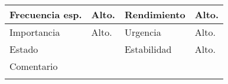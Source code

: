 \documentclass{article}
\begin{document}
\begin{table}[h]
\begin{tabular}{|l|l|l|l|l|l|}
\hline
\multicolumn{1}{|p{2cm}|}{Frecuencia esp.} & \multicolumn{2}{p{3cm}}{Alto.} & \multicolumn{1}{|p{2cm}|}{Rendimiento} & \multicolumn{2}{p{3cm}|}{Alto.}\\
\hline
\multicolumn{1}{|p{2cm}|}{Importancia} & \multicolumn{2}{p{3cm}}{Alto.} & \multicolumn{1}{|p{2cm}|}{Urgencia} & \multicolumn{2}{p{3cm}|}{Alto.}\\
\hline
\multicolumn{1}{|p{2cm}|}{Estado} & \multicolumn{2}{p{3cm}}{} & \multicolumn{1}{|p{2cm}|}{Estabilidad} & \multicolumn{2}{p{3cm}|}{Alto.}\\
\hline
\multicolumn{6}{|p{10cm}|}{Comentario}\\
\hline
\multicolumn{6}{|p{10cm}|}{}\\
\hline
\end{tabular}
\end{table}
\addtocounter{ni}{1}
\clearpage
\end{document}
